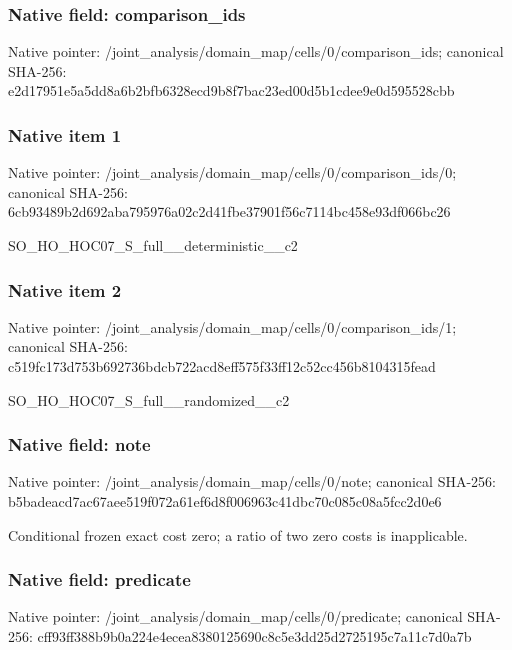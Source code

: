 \documentclass[10pt,a4paper]{article}
\begin{document}
\subsubsection{Native field: comparison\_\allowbreak{}ids}
Native pointer: /joint\_\allowbreak{}analysis/domain\_\allowbreak{}map/cells/0/comparison\_\allowbreak{}ids; canonical SHA-256: e2d17951e5a5dd8a6b2bfb6328ecd9b8f7bac23ed00d5b1cdee9e0d595528cbb

\subsubsection{Native item 1}
Native pointer: /joint\_\allowbreak{}analysis/domain\_\allowbreak{}map/cells/0/comparison\_\allowbreak{}ids/0; canonical SHA-256: 6cb93489b2d692aba795976a02c2d41fbe37901f56c7114bc458e93df066bc26

\begingroup\raggedright\sloppy SO\_\allowbreak{}HO\_\allowbreak{}HOC07\_\allowbreak{}S\_\allowbreak{}full\_\allowbreak{}\_\allowbreak{}deterministic\_\allowbreak{}\_\allowbreak{}c2\par\endgroup

\subsubsection{Native item 2}
Native pointer: /joint\_\allowbreak{}analysis/domain\_\allowbreak{}map/cells/0/comparison\_\allowbreak{}ids/1; canonical SHA-256: c519fc173d753b692736bdcb722acd8eff575f33ff12c52cc456b8104315fead

\begingroup\raggedright\sloppy SO\_\allowbreak{}HO\_\allowbreak{}HOC07\_\allowbreak{}S\_\allowbreak{}full\_\allowbreak{}\_\allowbreak{}randomized\_\allowbreak{}\_\allowbreak{}c2\par\endgroup

\subsubsection{Native field: note}
Native pointer: /joint\_\allowbreak{}analysis/domain\_\allowbreak{}map/cells/0/note; canonical SHA-256: b5badeacd7ac67aee519f072a61ef6d8f006963c41dbc70c085c08a5fcc2d0e6

\begingroup\raggedright\sloppy Conditional frozen exact cost zero;\allowbreak{} a ratio of two zero costs is inapplicable.\par\endgroup

\subsubsection{Native field: predicate}
Native pointer: /joint\_\allowbreak{}analysis/domain\_\allowbreak{}map/cells/0/predicate; canonical SHA-256: cff93ff388b9b0a224e4ecea8380125690c8c5e3dd25d2725195c7a11c7d0a7b
\end{document}
